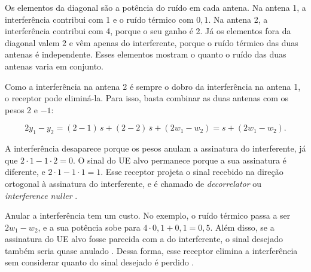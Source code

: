Os elementos da diagonal são a potência do ruído em cada antena. Na antena 1, a interferência contribui com 1 e o ruído térmico com $0{,}1$. Na antena 2, a interferência contribui com 4, porque o seu ganho é 2. Já os elementos fora da diagonal valem 2 e vêm apenas do interferente, porque o ruído térmico das duas antenas é independente. Esses elementos mostram o quanto o ruído das duas antenas varia em conjunto.



Como a interferência na antena 2 é sempre o dobro da interferência na antena 1, o receptor pode eliminá-la. Para isso, basta combinar as duas antenas com os pesos 2 e $-1$:

$$
2y_1 - y_2 = (2-1)\,s + (2-2)\,\overline{s} + (2w_1 - w_2) = s + (2w_1 - w_2).
$$

A interferência desaparece porque os pesos anulam a assinatura do interferente, já que $2\cdot 1 - 1\cdot 2 = 0$. O sinal do UE alvo permanece porque a sua assinatura é diferente, e $2\cdot 1 - 1\cdot 1 = 1$. Esse receptor projeta o sinal recebido na direção ortogonal à assinatura do interferente, e é chamado de \textit{decorrelator} ou \textit{interference nuller} \cite[p.~81--82]{tse-viswanath}.



Anular a interferência tem um custo. No exemplo, o ruído térmico passa a ser $2w_1 - w_2$, e a sua potência sobe para $4\cdot 0{,}1 + 0{,}1 = 0{,}5$. Além disso, se a assinatura do UE alvo fosse parecida com a do interferente, o sinal desejado também seria quase anulado \cite[p.~81]{tse-viswanath}. Dessa forma, esse receptor elimina a interferência sem considerar quanto do sinal desejado é perdido \cite[p.~358]{tse-viswanath}.

